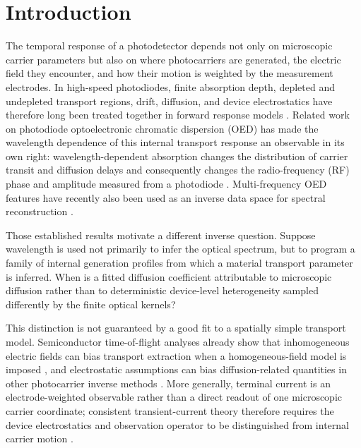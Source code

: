 \documentclass[aps,pra,twocolumn,superscriptaddress,nofootinbib]{revtex4-2}
\begin{document}
\maketitle

\section{Introduction}

The temporal response of a photodetector depends not only on microscopic carrier parameters but also on where photocarriers are generated, the electric field they encounter, and how their motion is weighted by the measurement electrodes. In high-speed photodiodes, finite absorption depth, depleted and undepleted transport regions, drift, diffusion, and device electrostatics have therefore long been treated together in forward response models \cite{hu2015pda}. Related work on photodiode optoelectronic chromatic dispersion (OED) has made the wavelength dependence of this internal transport response an observable in its own right: wavelength-dependent absorption changes the distribution of carrier transit and diffusion delays and consequently changes the radio-frequency (RF) phase and amplitude measured from a photodiode \cite{glasser2021oed,liokumovitch2021germanium,liokumovitch2022femtometer,dutta2024pin,mudgal2024pn}. Multi-frequency OED features have recently also been used as an inverse data space for spectral reconstruction \cite{kassa2026spectroscopy}.

Those established results motivate a different inverse question. Suppose wavelength is used not primarily to infer the optical spectrum, but to program a family of internal generation profiles from which a material transport parameter is inferred. When is a fitted diffusion coefficient attributable to microscopic diffusion rather than to deterministic device-level heterogeneity sampled differently by the finite optical kernels?

This distinction is not guaranteed by a good fit to a spatially simple transport model. Semiconductor time-of-flight analyses already show that inhomogeneous electric fields can bias transport extraction when a homogeneous-field model is imposed \cite{emelianova2006tof}, and electrostatic assumptions can bias diffusion-related quantities in other photocarrier inverse methods \cite{hattori1992sspg}. More generally, terminal current is an electrode-weighted observable rather than a direct readout of one microscopic carrier coordinate; consistent transient-current theory therefore requires the device electrostatics and observation operator to be distinguished from internal carrier motion \cite{hawks2015current}.
\end{document}

